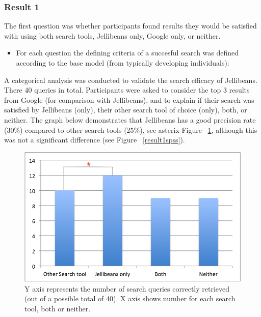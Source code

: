 \documentclass[a4paper, 11pt]{article}
\begin{document}
\subsubsection{Result 1}
The first question was whether participants found results they would be satisfied with using both search tools, Jellibeans only, Google only, or neither.

\vspace{5mm}
\begin{itemize}
\item{For each question the defining criteria of a succesful search was defined according to the base model (from typically developing individuals):}
\end{itemize}

A categorical analysis was conducted to validate the search efficacy of Jellibeans. There 40 queries in total. Participants were asked to consider the top 3 results from Google (for comparison with Jellibeans), and to explain if their search was satisfied by Jellibeans (only), their other search tool of choice (only), both, or neither. The graph below demonstrates that Jellibeans has a good precision rate (30\%) compared to other search tools (25\%), see asterix Figure ~\ref{result1}, although this was not a significant difference (see Figure ~\ref{result1spss}).
\begin{figure}[H]
\begin{center}
\includegraphics[scale=1]{Result1star}
\caption{Y axis represents the number of search queries correctly retrieved (out of a possible total of 40). X axis shows number for each search tool, both or neither.}
\label{result1}
\end{center}
\end{figure}
\end{document}
